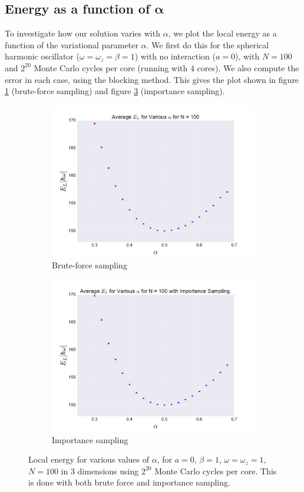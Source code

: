 \documentclass[a4paper, 10pt]{article}
\begin{document}
	\subsection{Energy as a function of $\boldsymbol{\alpha}$}
	To investigate how our solution varies with $\alpha$, we plot the local energy as a function of the variational parameter $\alpha$. We first do this for the spherical harmonic oscillator ($\omega=\omega_z=\beta=1$) with no interaction ($a=0$), with $N=100$ and $2^{20}$ Monte Carlo cycles per core (running with $4$ cores). We also compute the error in each case, using the blocking method. This gives the plot shown in figure \ref{fig:Average_EL_N=100_brute_force} (brute-force sampling) and figure \ref{fig:Average_EL_N=100_importance} (importance sampling).\\
	\pagebreak	
		\begin{figure}[ht!]
			\centering
				\begin{subfigure}{1\textwidth}
					\centering
					\includegraphics[width=.8\linewidth]{../Results/Energy_as_a_function_of_alpha/EvAlphaN100.pdf}
					\caption{Brute-force sampling}\label{fig:Average_EL_N=100_brute_force}
				\end{subfigure}
				\begin{subfigure}{1\textwidth}
					\centering
					\includegraphics[width=.8\linewidth]{../Results/Energy_as_a_function_of_alpha/EvAlphaN100IS.pdf}
					\caption{Importance sampling}\label{fig:Average_EL_N=100_importance}
				\end{subfigure}
			\caption{Local energy for various values of $\alpha$, for $a=0$, $\beta=1$, $\omega=\omega_z=1$, $N=100$ in 3 dimensions using $2^{20}$ Monte Carlo cycles per core. This is done with both brute force and importance sampling.}
		\end{figure}
\end{document}
